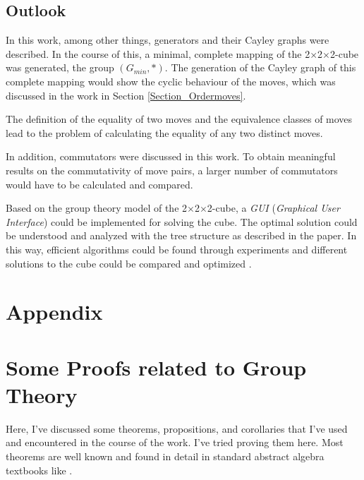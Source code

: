 \documentclass[12pt,a4paper]{article}
\theoremstyle{custom}
\newcommand{\Ttwo}{2$\times$2$\times$2-}
\begin{document}
\subsection*{Outlook}

In this work, among other things, generators and their Cayley graphs were described. In the course of this, a minimal, complete mapping of the \Ttwo cube was generated, the group $\left(G_{min}, \scriptstyle*\right)$. The generation of the Cayley graph of this complete mapping would show the cyclic behaviour of the moves, which was discussed in the work in Section \ref{Section_Ordermoves}.  


The definition of the equality of two moves and the equivalence classes of moves lead to the problem of calculating the equality of any two distinct moves.

In addition, commutators were discussed in this work. To obtain meaningful results on the commutativity of move pairs, a larger number of commutators would have to be calculated and compared. 


Based on the group theory model of the \Ttwo cube, a \textit{GUI} (\textit{Graphical User Interface}) could be implemented for solving the cube. The optimal solution could be understood and analyzed with the tree structure as described in the paper. In this way, efficient algorithms could be found through experiments and different solutions to the cube could be compared and optimized \cite{article,kaurstudy}. 
\newpage
\section*{Appendix}
\appendix
\section{Some Proofs related to Group Theory}
\label{Cycle Proof}
Here, I've discussed some theorems, propositions, and corollaries that I've used and encountered in the course of the work. I've tried proving them here. Most theorems are well known and found in detail in standard abstract algebra textbooks like \cite{gallian,dummit2003abstract}. 
\end{document}
